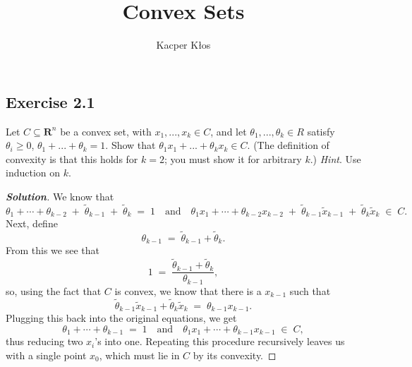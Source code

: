 \documentclass[12pt]{article}
\title{Convex Sets}
\author{Kacper Kłos}
\newenvironment{Solution}
  {\begin{proof}[\textbf{Solution}]}
  {\end{proof}}
\begin{document}
\maketitle

\subsection*{Exercise 2.1}
Let $C \subseteq \mathbf{R}^n$ be a convex set, with $x_1, ... , x_k \in C$, and let $\theta_1, ... , \theta_k \in R$ satisfy $\theta_i \geq 0$,
$\theta_1 + ... + \theta_k = 1$. Show that $\theta_1 x_1 + ... + \theta_k x_k \in C$. (The definition of convexity is that
this holds for $k = 2$; you must show it for arbitrary $k$.) \textit{Hint}. Use induction on $k$.
\begin{Solution}
We know that 
\[
\theta_1 + \cdots + \theta_{k-2} \;+\; \tilde{\theta}_{k-1} \;+\; \tilde{\theta}_{k}
\;=\;
1
\quad \text{and} \quad
\theta_1 x_1 + \cdots + \theta_{k-2} x_{k-2} \;+\; \tilde{\theta}_{k-1} \tilde{x}_{k-1} \;+\; \tilde{\theta}_{k} \tilde{x}_{k}
\;\in\; C.
\]
Next, define 
\[
\theta_{k-1} 
\;=\; 
\tilde{\theta}_{k-1} + \tilde{\theta}_{k}.
\]
From this we see that
\[
1 
\;=\; 
\frac{\tilde{\theta}_{k-1} + \tilde{\theta}_{k}}{\theta_{k-1}},
\]
so, using the fact that \(C\) is convex, we know that there is a \(x_{k-1}\) such that
\[
\tilde{\theta}_{k-1} \tilde{x}_{k-1} + \tilde{\theta}_{k} \tilde{x}_{k}
\;=\;
\theta_{k-1} x_{k-1}.
\]
Plugging this back into the original equations, we get
\[
\theta_1 + \cdots + \theta_{k-1} \;=\; 1
\quad \text{and} \quad
\theta_1 x_1 + \cdots + \theta_{k-1} x_{k-1} \;\in\; C,
\]
thus reducing two \(x_i\)'s into one. Repeating this procedure recursively leaves us with a single point \(x_0\), which must lie in \(C\) by its convexity.
\end{Solution}
\end{document}
